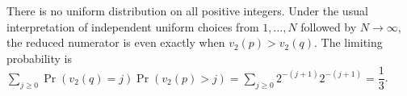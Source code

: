 There is no uniform distribution on all positive integers. Under the usual interpretation of independent uniform choices from $1,\ldots,N$ followed by $N\to\infty$, the reduced numerator is even exactly when $v_2(p)>v_2(q)$. The limiting probability is $\sum_{j\ge0}\Pr(v_2(q)=j)\Pr(v_2(p)>j)=\sum_{j\ge0}2^{-(j+1)}2^{-(j+1)}=\boxed{\dfrac{1}{3}}$.
